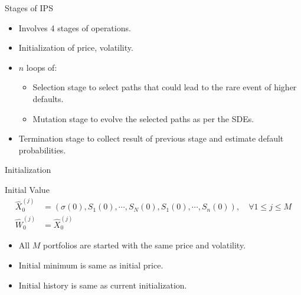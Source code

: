 \begin{frame}{Stages of IPS}
	\begin{itemize}
		\item Involves 4 stages of operations.
		\item Initialization of price, volatility.
		\item $n$ loops of:
		      \begin{itemize}
		      	\item Selection stage to select paths that could lead to the
		      	      rare event of higher defaults.
		      	\item Mutation stage to evolve the selected paths as per the
		      	      SDEs.
		      \end{itemize}
		\item Termination stage to collect result of previous stage and estimate
		      default probabilities.
	\end{itemize}
\end{frame}

\begin{frame}{Initialization}
	\begin{block}{Initial Value}
		\begin{equation*}
			\begin{split}
				\hat{X}_0^{(j)} &= \left( \sigma(0), S_1(0), \cdots, S_N(0), S_1(0), \cdots, S_n(0) \right),  \quad 
				\forall 1 \leq j\leq M                                                                    \\
				\hat{W}_0^{(j)} &= \hat{X}_0^{(j)}
			\end{split}
		\end{equation*}
	\end{block}
	\begin{itemize}
		\item All $M$ portfolios are started with the same price and volatility.
		\item Initial minimum is same as initial price.
		\item Initial history is same as current initialization.
	\end{itemize}
\end{frame}

